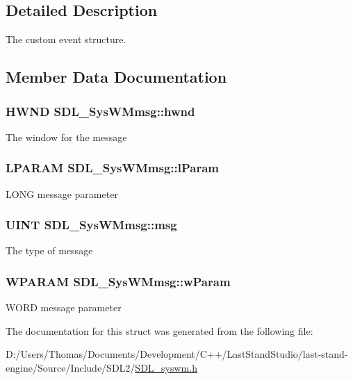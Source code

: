 \subsection{Detailed Description}
The custom event structure. 

\subsection{Member Data Documentation}
\hypertarget{structSDL__SysWMmsg_a55cf9583b5eddfe60a5c9851f9cce457}{}
\subsubsection[{hwnd}]{\setlength{\rightskip}{0pt plus 5cm}H\+W\+N\+D S\+D\+L\+\_\+\+Sys\+W\+Mmsg\+::hwnd}\label{structSDL__SysWMmsg_a55cf9583b5eddfe60a5c9851f9cce457}
The window for the message \hypertarget{structSDL__SysWMmsg_a24c1e4c3cb8d9781d34e5d99df66ac36}{}
\subsubsection[{l\+Param}]{\setlength{\rightskip}{0pt plus 5cm}L\+P\+A\+R\+A\+M S\+D\+L\+\_\+\+Sys\+W\+Mmsg\+::l\+Param}\label{structSDL__SysWMmsg_a24c1e4c3cb8d9781d34e5d99df66ac36}
L\+O\+N\+G message parameter \hypertarget{structSDL__SysWMmsg_a74894ed060d5508ab06aac584154d61e}{}
\subsubsection[{msg}]{\setlength{\rightskip}{0pt plus 5cm}U\+I\+N\+T S\+D\+L\+\_\+\+Sys\+W\+Mmsg\+::msg}\label{structSDL__SysWMmsg_a74894ed060d5508ab06aac584154d61e}
The type of message \hypertarget{structSDL__SysWMmsg_a7463730478d90ebc031d83098f3f74fc}{}
\subsubsection[{w\+Param}]{\setlength{\rightskip}{0pt plus 5cm}W\+P\+A\+R\+A\+M S\+D\+L\+\_\+\+Sys\+W\+Mmsg\+::w\+Param}\label{structSDL__SysWMmsg_a7463730478d90ebc031d83098f3f74fc}
W\+O\+R\+D message parameter 

The documentation for this struct was generated from the following file\+:\begin{DoxyCompactItemize}
\item 
D\+:/\+Users/\+Thomas/\+Documents/\+Development/\+C++/\+Last\+Stand\+Studio/last-\/stand-\/engine/\+Source/\+Include/\+S\+D\+L2/\hyperlink{SDL__syswm_8h}{S\+D\+L\+\_\+syswm.\+h}\end{DoxyCompactItemize}
